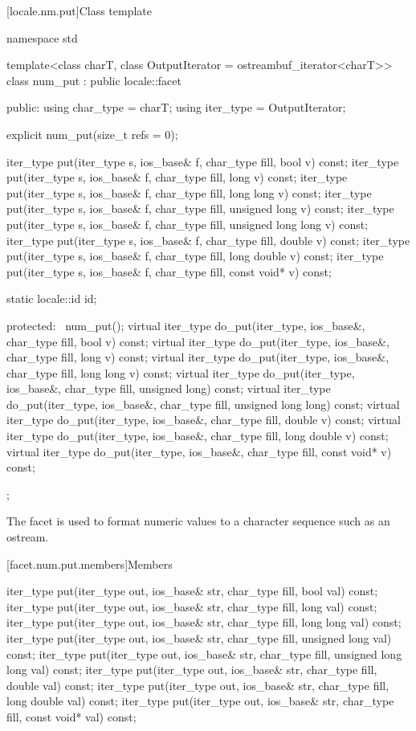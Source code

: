 [locale.nm.put]{Class template }

%
\begin{codeblock}
namespace std {
  template<class charT, class OutputIterator = ostreambuf_iterator<charT>>
    class num_put : public locale::facet {
    public:
      using char_type = charT;
      using iter_type = OutputIterator;

      explicit num_put(size_t refs = 0);

      iter_type put(iter_type s, ios_base& f, char_type fill, bool v) const;
      iter_type put(iter_type s, ios_base& f, char_type fill, long v) const;
      iter_type put(iter_type s, ios_base& f, char_type fill, long long v) const;
      iter_type put(iter_type s, ios_base& f, char_type fill, unsigned long v) const;
      iter_type put(iter_type s, ios_base& f, char_type fill, unsigned long long v) const;
      iter_type put(iter_type s, ios_base& f, char_type fill, double v) const;
      iter_type put(iter_type s, ios_base& f, char_type fill, long double v) const;
      iter_type put(iter_type s, ios_base& f, char_type fill, const void* v) const;

      static locale::id id;

    protected:
      ~num_put();
      virtual iter_type do_put(iter_type, ios_base&, char_type fill, bool v) const;
      virtual iter_type do_put(iter_type, ios_base&, char_type fill, long v) const;
      virtual iter_type do_put(iter_type, ios_base&, char_type fill, long long v) const;
      virtual iter_type do_put(iter_type, ios_base&, char_type fill, unsigned long) const;
      virtual iter_type do_put(iter_type, ios_base&, char_type fill, unsigned long long) const;
      virtual iter_type do_put(iter_type, ios_base&, char_type fill, double v) const;
      virtual iter_type do_put(iter_type, ios_base&, char_type fill, long double v) const;
      virtual iter_type do_put(iter_type, ios_base&, char_type fill, const void* v) const;
    };
}
\end{codeblock}

\pnum
The facet
is used to format numeric values to a character sequence such as an ostream.

[facet.num.put.members]{Members}

%
\begin{itemdecl}
iter_type put(iter_type out, ios_base& str, char_type fill, bool val) const;
iter_type put(iter_type out, ios_base& str, char_type fill, long val) const;
iter_type put(iter_type out, ios_base& str, char_type fill, long long val) const;
iter_type put(iter_type out, ios_base& str, char_type fill, unsigned long val) const;
iter_type put(iter_type out, ios_base& str, char_type fill, unsigned long long val) const;
iter_type put(iter_type out, ios_base& str, char_type fill, double val) const;
iter_type put(iter_type out, ios_base& str, char_type fill, long double val) const;
iter_type put(iter_type out, ios_base& str, char_type fill, const void* val) const;
\end{itemdecl}

